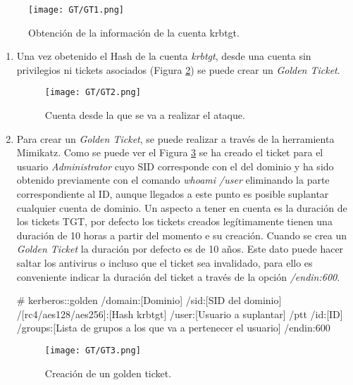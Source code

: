 \begin{figure}[H] %
\begin{center}
\texttt{[image: GT/GT1.png]}
\end{center}
\caption{Obtención de la información de la cuenta krbtgt.}
\label{GT1}
\end{figure}


\begin{enumerate}

\item Una vez obetenido el Hash de la cuenta {\it krbtgt}, desde una cuenta sin privilegios ni tickets asociados (Figura \ref{GT2}) se puede crear un {\it Golden Ticket}. 
\begin{figure}[H] %
\begin{center}
\texttt{[image: GT/GT2.png]}
\end{center}
\caption{Cuenta desde la que se va a realizar el ataque.}
\label{GT2}
\end{figure}

\item Para crear un {\it Golden Ticket}, se puede realizar a través de la herramienta Mimikatz. Como se puede ver el Figura \ref{GT3} se ha creado el ticket para el usuario {\it Administrator} cuyo SID corresponde con el del dominio y ha sido obtenido previamente con el comando {\it whoami /user} eliminando la parte correspondiente al ID, aunque llegados a este punto es posible suplantar cualquier cuenta de dominio. Un aspecto a tener en cuenta es la duración de los tickets TGT, por defecto los tickets creados legítimamente tienen una duración de 10 horas a partir del momento e su creación. Cuando se crea un {\it Golden Ticket} la duración por defecto es de 10 años. Este dato puede hacer saltar los antivirus o incluso que el ticket sea invalidado, para ello es conveniente indicar la duración del ticket a través de la opción {\it /endin:600}. 

\begin{listing}[style=consola, numbers=none]
# kerberos::golden /domain:[Dominio] /sid:[SID del dominio] /[rc4/aes128/aes256]:[Hash krbtgt] /user:[Usuario a suplantar] /ptt /id:[ID] /groups:[Lista de grupos a los que va a pertenecer el usuario] /endin:600
\end{listing}

\begin{figure}[H] %
\begin{center}
\texttt{[image: GT/GT3.png]}
\end{center}
\caption{Creación de un golden ticket.}
\label{GT3}
\end{figure}


\end{enumerate}
